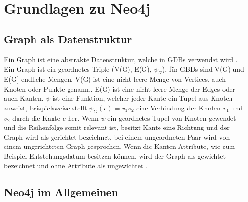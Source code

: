 
\chapter{Grundlagen zu Neo4j} %

\label{Kaptiel 2} %

\section{Graph als Datenstruktur}

Ein Graph ist eine abstrakte Datenstruktur, welche in GDBs verwendet wird \parencite{vicknair2010comparison}. Ein Graph ist ein geordnetes Triple (V(G), E(G), $\psi_G$), für GBDs sind V(G) und E(G) endliche Mengen. V(G) ist eine nicht leere Menge von Vertices, auch Knoten oder Punkte genannt. E(G) ist eine nicht leere Menge der Edges oder auch Kanten. $\psi$ ist eine Funktion, welcher jeder Kante ein Tupel aus Knoten zuweist, beispielsweise stellt $\psi_G (e) = v_1 v_2$ eine Verbindung der Knoten $v_1$ und $v_2$ durch die Kante $e$ her. Wenn $\psi$ ein geordnetes Tupel von Knoten gewendet und die Reihenfolge somit relevant ist, besitzt Kante  eine  Richtung und der Graph wird als gerichtet bezeichnet, bei einem ungeordneten Paar wird von einem ungerichteten Graph gesprochen. Wenn die Kanten Attribute, wie zum Beispiel Entstehungsdatum besitzen können, wird der Graph als gewichtet bezeichnet und ohne Attribute als ungewichtet \parencite{bondy1976graph}.

\section{Neo4j im Allgemeinen}

